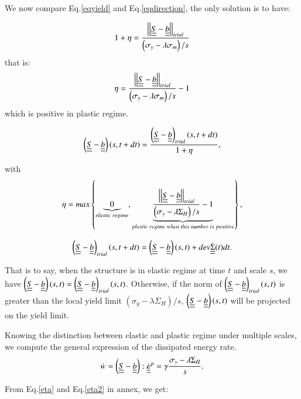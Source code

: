 \documentclass[3p,times,procedia,number]{elsarticle}
\begin{document}
We now compare Eq.\eqref{eqyield} and Eq.\eqref{eqdirection}, the only solution is to have:

\begin{equation}
	1+\eta=\dfrac{\left| \left|\uline{\uline{S}}-\uline{\uline{b}}\right| \right|_{trial}}{\left( \sigma_y-\lambda \sigma_m\right)/s}
\end{equation}
that is:
\begin{equation}
	\eta=\dfrac{\left| \left|\uline{\uline{S}}-\uline{\uline{b}}\right| \right|_{trial}}{\left( \sigma_y-\lambda \sigma_m\right)/s}-1
	\label{eta2}
\end{equation}
which is positive in plastic regime.

\begin{equation}
	\left( \uline{\uline{S}}-\uline{\uline{b}}\right) (s,t+dt)=\dfrac{\left( \uline{\uline{S}}-\uline{\uline{b}}\right)_{trial} (s,t+dt)}{1+\eta},
\end{equation}

with $$\eta=max\left\lbrace \underbrace{0}_{elastic\; regime}, \underbrace{\dfrac{\left| \left|\uline{\uline{S}}-\uline{\uline{b}}\right| \right|_{trial}}{\left( \sigma_y-\lambda \Sigma_H\right)/s}-1}_{plastic \; regime\; when\; this\; number\; is\; positive}\right\rbrace, $$

$$\left( \uline{\uline{S}}-\uline{\uline{b}}\right)_{trial} (s,t+dt)=\left( \uline{\uline{S}}-\uline{\uline{b}}\right)(s,t)+dev\dot{\uline{\uline{\Sigma}}}(t)dt.$$

That is to say, when the structure is in elastic regime at time $t$ and scale $s$, we have $\left( \uline{\uline{S}}-\uline{\uline{b}}\right)(s,t)=\left( \uline{\uline{S}}-\uline{\uline{b}}\right)_{trial} (s,t)$. Otherwise, if  the norm of $\left( \uline{\uline{S}}-\uline{\uline{b}}\right)_{trial} (s,t)$ is greater than the local yield limit $\left( \sigma_y-\lambda \Sigma_H\right)/s$, $\left( \uline{\uline{S}}-\uline{\uline{b}}\right)(s,t)$ will be projected on the yield limit. 

Knowing the distinction between elastic and plastic regime under multiple scales, we compute the general expression of the dissipated energy rate.
\begin{equation}
	\dot{w}=\left( \uline{\uline{S}}-\uline{\uline{b}}\right) :\dot{\uline{\uline{\varepsilon}}}^p=\gamma\dfrac{ \sigma_y-\lambda \Sigma_H}{s}.
	\label{w}
\end{equation}

From Eq.\eqref{eta} and Eq.\eqref{eta2} in annex, we get:
\end{document}

